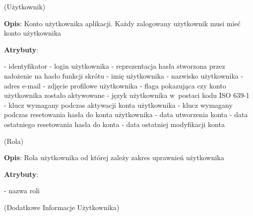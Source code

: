 \begin{enumerate}[label={\textbf{KAT/\protect\threedigits{\theenumi}}}, wide, labelwidth=!, labelindent=0pt, labelsep=0pt, series=reqs]
    \setlength\itemsep{1em}
    \label{kat:User} (Użytkownik)

    \textbf{Opis}: Konto użytkownika aplikacji. Każdy zalogowany użytkownik musi mieć konto użytkownika
    \par
    \textbf{Atrybuty}:
    \begin{itemize}[series=atr, wide, align=left, leftmargin=190pt]
        \label{kat:User:id}- identyfikator
        \label{kat:User:login}- login użytkownika
        \label{kat:User:passwordHash}- reprezentacja hasła stworzona przez nałożenie na hasło funkcji skrótu
        \label{kat:User:firstName}- imię użytkownika
        \label{kat:User:lastName}- nazwisko użytkownika
        \label{kat:User:email}- adres e-mail
        \label{kat:User:image}- zdjęcie profilowe użytkownika
        \label{kat:User:activated}- flaga pokazująca czy konto użytkownika zostało aktywowane
        \label{kat:User:language}- język użytkownika w~postaci kodu ISO 639-1
        \label{kat:User:activationKey}- klucz wymagany podczas aktywacji konta użytkownika
        \label{kat:User:resetKey}- klucz wymagany podczas resetowania hasła do konta użytkownika
        \label{kat:User:createdDate}- data utworzenia konta
        \label{kat:User:resetDate}- data ostatniego resetowania hasła do konta
        \label{kat:User:lastModifiedDate}- data ostatniej modyfikacji konta
    \end{itemize}

    \label{kat:Authority} (Rola)

    \textbf{Opis}: Rola użytkownika od której zależy zakres uprawnień użytkownika
    \par
    \textbf{Atrybuty}:
    \begin{itemize}[series=atr, wide, align=left, leftmargin=190pt]
        \label{kat:Authority:name}- nazwa roli
    \end{itemize}

    \label{kat:UserExtraInfo} (Dodatkowe Informacje Użytkownika)


\end{enumerate}
